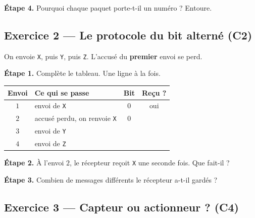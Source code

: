 \textbf{Étape 4.} Pourquoi chaque paquet porte-t-il un numéro ? Entoure.

\medskip
\begin{center}
 \qquad {}
\end{center}

\bigskip
\bigskip

\subsection*{Exercice 2 --- Le protocole du bit alterné (C2)}

On envoie \texttt{X}, puis \texttt{Y}, puis \texttt{Z}. L'accusé du \textbf{premier}
envoi se perd.

\bigskip

\textbf{Étape 1.} Complète le tableau. Une ligne à la fois.

\bigskip

\begin{center}
\begin{tabular}{|c|l|c|c|}
\hline
\textbf{Envoi} & \textbf{Ce qui se passe} & \textbf{Bit} & \textbf{Reçu ?} \\
\hline
$1$ & envoi de \texttt{X} & $0$ & oui \\
\hline
$2$ & accusé perdu, on renvoie \texttt{X} & $0$ & \dotfill \\
\hline
$3$ & envoi de \texttt{Y} & \dotfill & \dotfill \\
\hline
$4$ & envoi de \texttt{Z} & \dotfill & \dotfill \\
\hline
\end{tabular}
\end{center}

\bigskip

\textbf{Étape 2.} À l'envoi $2$, le récepteur reçoit \texttt{X} une seconde fois.
Que fait-il ?

\medskip
\begin{center}
 \qquad {}
\end{center}

\bigskip

\textbf{Étape 3.} Combien de messages différents le récepteur a-t-il gardés ?

\medskip
\dotfill

\bigskip
\bigskip

\subsection*{Exercice 3 --- Capteur ou actionneur ? (C4)}

